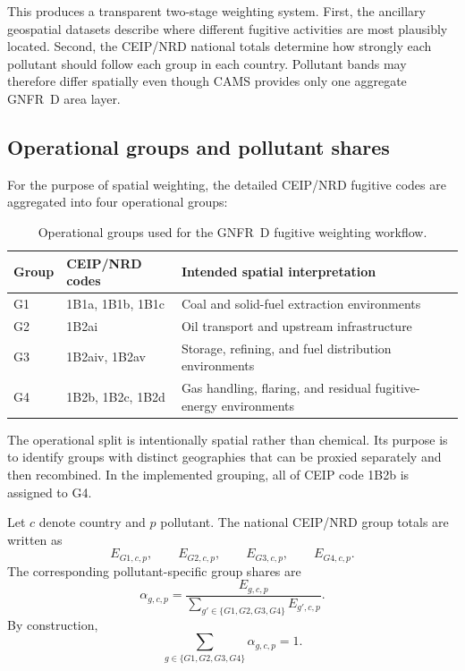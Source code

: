 This produces a transparent two-stage weighting system. First, the
ancillary geospatial datasets describe where different fugitive
activities are most plausibly located. Second, the CEIP/NRD national
totals determine how strongly each pollutant should follow each group in
each country. Pollutant bands may therefore differ spatially even though
CAMS provides only one aggregate GNFR~D area layer.

\subsection{Operational groups and pollutant shares}

For the purpose of spatial weighting, the detailed CEIP/NRD fugitive
codes are aggregated into four operational groups:
\begin{table}[htbp]
  \centering
  \caption{Operational groups used for the GNFR~D fugitive weighting workflow.}
  \label{tab:fugitive_groups}
  \begin{tabular}{p{1.2cm}p{3.2cm}p{7.0cm}}
    \hline
    Group & CEIP/NRD codes & Intended spatial interpretation \\
    \hline
    G1 & 1B1a, 1B1b, 1B1c & Coal and solid-fuel extraction environments \\
    G2 & 1B2ai & Oil transport and upstream infrastructure \\
    G3 & 1B2aiv, 1B2av & Storage, refining, and fuel distribution environments \\
    G4 & 1B2b, 1B2c, 1B2d & Gas handling, flaring, and residual fugitive-energy environments \\
    \hline
  \end{tabular}
\end{table}

The operational split is intentionally spatial rather than chemical. Its
purpose is to identify groups with distinct geographies that can be
proxied separately and then recombined. In the implemented grouping, all
of CEIP code 1B2b is assigned to G4.

Let $c$ denote country and $p$ pollutant. The national CEIP/NRD group
totals are written as
\begin{equation}
  E_{G1,c,p},\qquad E_{G2,c,p},\qquad E_{G3,c,p},\qquad E_{G4,c,p}.
\end{equation}
The corresponding pollutant-specific group shares are
\begin{equation}
  \alpha_{g,c,p} =
  \frac{E_{g,c,p}}
       {\displaystyle\sum_{g' \in \{G1,G2,G3,G4\}} E_{g',c,p}}.
\end{equation}
By construction,
\begin{equation}
  \sum_{g \in \{G1,G2,G3,G4\}} \alpha_{g,c,p} = 1.
\end{equation}


